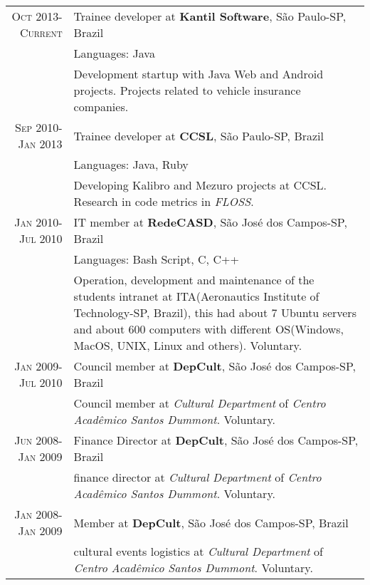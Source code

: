 \documentclass[a4paper,10pt]{article} %
\begin{document}
\begin{tabular}{r|p{11cm}}

\textsc{Oct 2013-Current} & Trainee developer at \textbf{Kantil Software}, São Paulo-SP, Brazil \emph{}\\
& \footnotesize{Languages: Java}\\
       & \footnotesize{Development startup with Java Web and Android projects. Projects related to vehicle insurance companies.} 
       \multicolumn{2}{c}{} \\
	

\textsc{Sep 2010-Jan 2013} & Trainee developer at \textbf{CCSL}, São Paulo-SP, Brazil \emph{}\\
& \footnotesize{Languages: Java, Ruby}\\
       & \footnotesize{Developing Kalibro and Mezuro projects at CCSL. Research in code metrics in \emph{FLOSS}.}
\multicolumn{2}{c}{} \\


\textsc{Jan 2010-Jul 2010} & IT member at \textbf{RedeCASD}, São José dos Campos-SP, Brazil \emph{}\\
& \footnotesize{Languages: Bash Script, C, C++}\\
       & \footnotesize{Operation, development and maintenance of the students intranet at ITA(Aeronautics Institute of
       Technology-SP, Brazil), this had about 7 Ubuntu servers and about 600 computers with different
       OS(Windows, MacOS, UNIX, Linux and others). Voluntary.}
\multicolumn{2}{c}{} \\


\textsc{Jan 2009-Jul 2010} & Council member at \textbf{DepCult}, São José dos Campos-SP, Brazil \emph{}\\
& \footnotesize{Council member at \emph{Cultural Department} of 
       \emph{Centro Acad\^{e}mico Santos Dummont}. Voluntary.}
\multicolumn{2}{c}{} \\



\textsc{Jun 2008-Jan 2009} & Finance Director at \textbf{DepCult}, São José dos Campos-SP, Brazil \emph{}\\
& \footnotesize{finance director at \emph{Cultural Department} of 
       \emph{Centro Acad\^{e}mico Santos Dummont}. Voluntary.}
\multicolumn{2}{c}{}\\



\textsc{Jan 2008-Jan 2009} & Member at \textbf{DepCult}, São José dos Campos-SP, Brazil \emph{}\\
& \footnotesize{cultural events logistics at \emph{Cultural Department} of \emph{Centro Acad\^{e}mico Santos Dummont}. Voluntary.}\\

\end{tabular}
\end{document}

